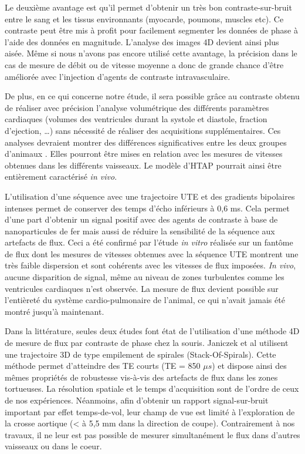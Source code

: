 Le deuxième avantage est qu’il permet d’obtenir un très bon contraste-sur-bruit entre le sang et les tissus environnants (myocarde, poumons, muscles etc). Ce contraste peut être mis à profit pour facilement segmenter les données de phase à l’aide des données en magnitude. L’analyse des images 4D devient ainsi plus aisée. Même si nous n’avons pas encore utilisé cette avantage, la précision dans le cas de mesure de débit ou de vitesse moyenne a donc de grande chance d’être améliorée avec l’injection d’agents de contraste intravasculaire. 

De plus, en ce qui concerne notre étude, il sera possible grâce au contraste obtenu de réaliser avec précision l’analyse volumétrique des différents paramètres cardiaques (volumes des ventricules durant la systole et diastole, fraction d’ejection, …) sans nécessité de réaliser des acquisitions supplémentaires. Ces analyses devraient montrer des différences significatives entre les deux groupes d’animaux \cite{Miraux:2009rm}. Elles pourront être mises en relation avec les mesures de vitesses obtenues dans les différents vaisseaux. Le modèle d’HTAP pourrait ainsi être entièrement caractérisé \textit{in vivo}.

L’utilisation d’une séquence avec une trajectoire UTE et des gradients bipolaires intenses permet de conserver des temps d’écho inférieurs à 0,6 ms. Cela permet d’une part d’obtenir un signal positif avec des agents de contraste à base de nanoparticules de fer mais aussi de réduire la sensibilité de la séquence aux artefacts de flux. Ceci a été confirmé par l’étude \textit{in vitro} réalisée sur un fantôme de flux dont les mesures de vitesses obtenues avec la séquence UTE montrent une très faible dispersion et sont cohérents avec les vitesses de flux imposées. \textit{In vivo}, aucune disparition de signal, même au niveau de zones turbulentes comme les ventricules cardiaques n’est observée. La mesure de flux devient possible sur l’entièreté du système cardio-pulmonaire de l’animal, ce qui n’avait jamais été montré jusqu’à maintenant.

Dans la littérature, seules deux études font état de l'utilisation d'une méthode 4D de mesure de flux par contraste de phase chez la souris. Janiczek et al \cite{Janiczek:2011qm} utilisent une trajectoire 3D de type empilement de spirales (Stack-Of-Spirals). Cette méthode permet d'atteindre des TE courts (TE = 850 $\mu s$) et dispose ainsi des mêmes propriétés de robustesse vis-à-vis des artefacts de flux dans les zones tortueuses. La résolution spatiale et le temps d'acquisition sont de l'ordre de ceux de nos expériences. Néanmoins, afin d’obtenir un rapport signal-sur-bruit important par effet temps-de-vol, leur champ de vue est limité à l’exploration de la crosse aortique (< à 5,5 mm dans la direction de coupe). Contrairement à nos travaux, il ne leur est pas possible de mesurer simultanément le flux dans d’autres vaisseaux ou dans le coeur.

